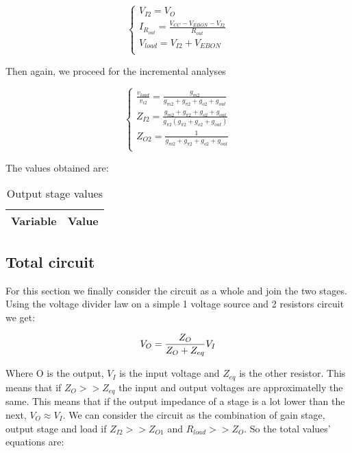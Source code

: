 \begin{equation}\label{eq:Op2}
\begin{cases}
V_{I2}=V_O\\
I_{R_{out}}= \frac{V_{CC}-V_{EBON}-V_{I2}}{R_{out}}\\
V_{load}=V_{I2}+ V_{EBON}\\
\end{cases}
\end{equation}

Then again, we proceed for the incremental analyses

\begin{equation}\label{eq:v2}
\begin{cases}
\frac{v_{load}}{v_{i2}}=\frac{g_{m2}}{g_{m2}+g_{\pi 2}+g_{o2}+g_{out}}\\
Z_{I2}= \frac{g_{m2}+g_{\pi 2}+ g_{o2}+g_{out}}{g_{\pi 2} (g_{\pi 2}+ g_{o2}+g_{out})}\\
Z_{O2}= \frac{1}{g_{m2}+g_{\pi 2}+ g_{o2}+g_{out}}\\
\end{cases}
\end{equation}

The values obtained are:

\begin{table}[H]
  \centering
  \begin{tabular}{|l|r|}
    \hline    
    {\bf Variable} & {\bf Value} \\ \hline
    
  \end{tabular}
  \caption{Output stage values}
  \label{tab:sim1}
\end{table}


\subsection{Total circuit}
For this section we finally consider the circuit as a whole and join the two stages. Using the voltage divider law on a simple 1 voltage source and 2 resistors circuit we get:

\begin{equation}\label{eq:approx}
V_O=\frac{Z_O}{Z_O+Z_{eq}}V_I\\
\end{equation}

 Where O is the output, $V_I$ is the input voltage and $Z_{eq}$ is the other resistor. This means that if $Z_O >> Z_{eq}$ the input and output voltages are approximatelly the same. This means that if the output impedance of a stage is a lot lower than the next, $V_O\approx V_I$. We can consider the circuit as the combination of gain stage, output stage and load if $Z_{I2} >> Z_{O1}$ and $R_{load} >> Z_{O}$. So the total values' equations are:
 
